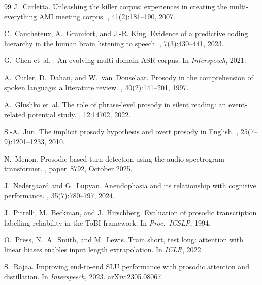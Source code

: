 \documentclass[11pt,letterpaper]{article}
\begin{document}
\begin{thebibliography}{99}
J.~Carletta.
\newblock Unleashing the killer corpus: experiences in creating the multi-everything {AMI} meeting corpus.
, 41(2):181--190, 2007.

C.~Caucheteux, A.~Gramfort, and J.-R. King.
\newblock Evidence of a predictive coding hierarchy in the human brain listening to speech.
, 7(3):430--441, 2023.

G.~Chen et~al.
: An evolving multi-domain {ASR} corpus.
\newblock In {\em Interspeech}, 2021.

A.~Cutler, D.~Dahan, and W.~van~Donselaar.
\newblock Prosody in the comprehension of spoken language: a literature review.
, 40(2):141--201, 1997.

A.~Glushko et~al.
\newblock The role of phrase-level prosody in silent reading: an event-related potential study.
, 12:14702, 2022.

S.-A.\ Jun.
\newblock The implicit prosody hypothesis and overt prosody in {English}.
, 25(7--9):1201--1233, 2010.

N.~Menon.
\newblock Prosodic-based turn detection using the audio spectrogram transformer.
, paper~8792, October 2025.

J.~Nedergaard and G.~Lupyan.
\newblock Anendophasia and its relationship with cognitive performance.
, 35(7):780--797, 2024.

J.~Pitrelli, M.~Beckman, and J.~Hirschberg.
\newblock Evaluation of prosodic transcription labelling reliability in the {ToBI} framework.
\newblock In {\em Proc.\ ICSLP}, 1994.

O.~Press, N.~A.\ Smith, and M.~Lewis.
\newblock Train short, test long: attention with linear biases enables input length extrapolation.
\newblock In {\em ICLR}, 2022.

S.~Rajaa.
\newblock Improving end-to-end {SLU} performance with prosodic attention and distillation.
\newblock In {\em Interspeech}, 2023. arXiv:2305.08067.


\end{thebibliography}
\end{document}
